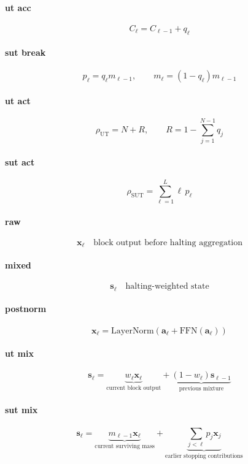 \documentclass{article}
\begin{document}
\paragraph{ut acc}
\[
C_{\ell}=C_{\ell-1}+q_{\ell}
\]

\paragraph{sut break}
\[
p_{\ell}=q_{\ell}m_{\ell-1},\qquad m_{\ell}=(1-q_{\ell})m_{\ell-1}
\]

\paragraph{ut act}
\[
\rho_{\mathrm{UT}}=N+R,\qquad R=1-\sum_{j=1}^{N-1}q_j
\]

\paragraph{sut act}
\[
\rho_{\mathrm{SUT}}=\sum_{\ell=1}^{L}\ell\,p_{\ell}
\]

\paragraph{raw}
\[
\mathbf{x}_{\ell}\quad\text{block output before halting aggregation}
\]

\paragraph{mixed}
\[
\mathbf{s}_{\ell}\quad\text{halting-weighted state}
\]

\paragraph{postnorm}
\[
\mathbf{x}_{\ell}=\mathrm{LayerNorm}\!\left(\mathbf{a}_{\ell}+\mathrm{FFN}(\mathbf{a}_{\ell})\right)
\]

\paragraph{ut mix}
\[
\mathbf{s}_{\ell}=\underbrace{w_{\ell}\mathbf{x}_{\ell}}_{\text{current block output}}+\underbrace{(1-w_{\ell})\mathbf{s}_{\ell-1}}_{\text{previous mixture}}
\]

\paragraph{sut mix}
\[
\mathbf{s}_{\ell}=\underbrace{m_{\ell-1}\mathbf{x}_{\ell}}_{\text{current surviving mass}}+\underbrace{\sum_{j<\ell}p_j\mathbf{x}_j}_{\text{earlier stopping contributions}}
\]
\end{document}
